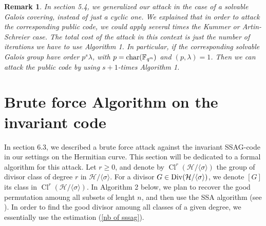 \documentclass[10pt]{article}
\newtheorem{rq1}[thm]{Remark}
\newcommand{\s}{\vspace{0.3cm}}
\newcommand{\fqm}{\mathbb{F}_{q^m}}
\newcommand{\Div}{\operatorname{Div}}
\newcommand{\Cl}{\operatorname{Cl}}
\begin{document}
\s


\begin{rq1} \rm
In section 5.4, we generalized our attack in the case of a solvable Galois covering, instead of just a cyclic one. We explained that in order to attack the corresponding public code, we could apply several times the Kummer or Artin-Schreier case. The total cost of the attack in this context is just the number of iterations we have to use Algorithm 1. In particular, if the corresponding solvable Galois group have order $p^s\lambda$, with $p=\rm char \it (\fqm)$ and $(p,\lambda)=1$. Then we can attack the public code by using $s+1$-times Algorithm 1.
\end{rq1}

\newpage

\section{Brute force Algorithm on the invariant code}

\s

In section 6.3, we described a brute force attack against the invariant SSAG-code in our settings on the Hermitian curve. This section will be dedicated to a formal algorithm for this attack. 
Let $r \geq 0$, and denote by $\Cl^r(\mathcal{H}/\langle \sigma \rangle)$ the group of divisor class of degree $r$ in $\mathcal{H}/\langle \sigma \rangle$. For a divisor $G \in \rm \Div \it (\mathcal{H}/\langle \sigma \rangle)$, we denote $[G]$ its class in $\Cl^r(\mathcal{H}/\langle \sigma \rangle)$. In Algorithm 2 below, we plan to recover the good permutation amoung all subsets of lenght $n$, and then use the SSA algorithm (see \cite{SSA}). In order to find the good divisor amoung all classes of a given degree, we essentially use the estimation (\ref{nb of sssag}).
\end{document}

